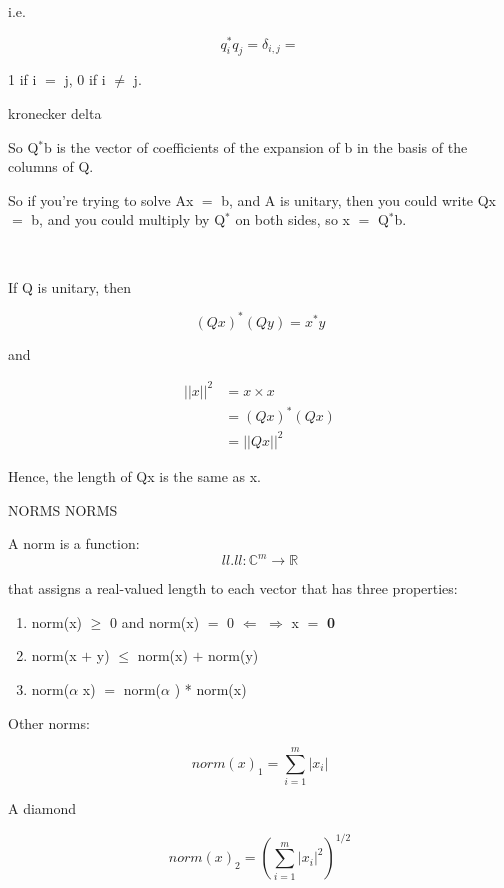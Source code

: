 \documentclass[12pt]{article}
\newcommand{\mt}[1]{\ensuremath{#1}}
\newcommand{\br}{\mt{\mathbb{R}} }       %
\newcommand{\bc}{\mt{\mathbb{C}} }       %
\newcommand{\afa}{\mt{\alpha} }
\newcommand{\lra}{ \mt{\longrightarrow} } %
\newcommand{\rar}{ \mt{\Rightarrow} }     %
\newcommand{\lar}{ \mt{\Leftarrow} }      %
\newcommand{\ps}{\mt{+} }
\newcommand{\lse}{\mt{\leq} }
\newcommand{\gre}{\mt{\geq} }
\newcommand{\eql}{\mt{=} }
\newcommand{\uf}[2]{#1\mt{^{#2}}}
\newcommand{\splt}[1]{\begin{split}#1\end{split}}
\begin{document}
i.e.

\begin{displaymath}
  q_i^* q_j = \delta_{i, j} =  
\end{displaymath}

1 if i \eql j, 0 if i $\neq$ j.

kronecker delta

So \uf{Q}{*}b is the vector of coefficients of the expansion of b in the basis of the columns of Q.

So if you're trying to solve Ax \eql b, and A is unitary, then you could write Qx \eql b, and you could multiply by \uf{Q}{*} on both sides, so x \eql \uf{Q}{*}b.

\

If Q is unitary, then

\begin{displaymath}
  (Qx)^* (Qy) = x^* y
\end{displaymath}

and 

\begin{displaymath}
	\splt{
  		||x||^2 & = x \times x \\
  		& = (Qx)^* (Qx) \\
  		& = ||Qx||^2
	}
\end{displaymath}

Hence, the length of Qx is the same as x.

NORMS NORMS

A norm is a function: 
\begin{displaymath}
	ll . ll : \bc^m \lra \br
\end{displaymath}

that assigns a real-valued length to each vector that has three properties:

\begin{enumerate}
  \item norm(x) \gre 0 and norm(x) \eql 0 \lar \rar x \eql \textbf{0}
  \item norm(x \ps y) \lse norm(x) \ps norm(y)
  \item norm(\afa x) \eql norm(\afa) * norm(x)
\end{enumerate}

Other norms:

\begin{displaymath}
  norm(x)_1 = \sum_{i = 1}^m |x_i|
\end{displaymath}

A diamond

\begin{displaymath}
  norm(x)_2 = (\sum_{i = 1}^m |x_i|^2)^{1/2}
\end{displaymath}
\end{document}
